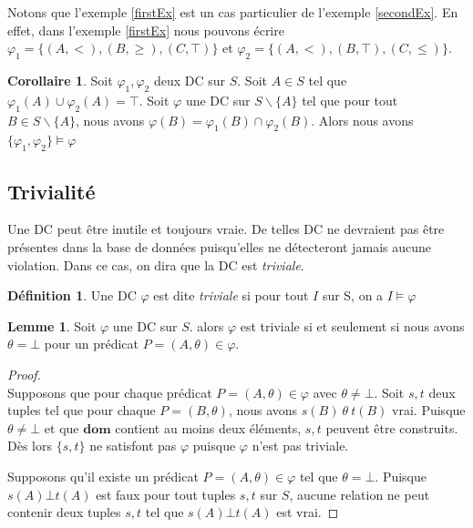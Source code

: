 \documentclass[letterpaper, 12pt]{report}
\theoremstyle{definition}
\newtheorem{mydef}{Définition}
\newtheorem{mylemma}{Lemme}
\newtheorem{mycorollaire}{Corollaire}
\newcommand{\dom}{\mathbf{dom}}
\newcommand{\alinea}{
\hspace*{0.5cm}}
\begin{document}
Notons que l'exemple \ref{firstEx} est un cas particulier de l'exemple \ref{secondEx}. En effet, dans l'exemple \ref{firstEx} nous pouvons écrire $\varphi_1 = \{(A,<),(B,\geq),(C,\top)  \}$ et $\varphi_2 = \{(A,<),(B,\top),(C,\leq)  \}$.\\

\begin{mycorollaire}
Soit $\varphi_1,\varphi_2$ deux DC sur $S$. Soit $A \in S$ tel que $\varphi_1(A)\cup\varphi_2(A) = \top$. Soit $\varphi$ une DC sur $S \backslash \{ A\}$ tel que pour tout $B \in S \backslash \{ A\}$, nous avons $\varphi(B) = \varphi_1(B) \cap \varphi_2(B)$. Alors nous avons $\{\varphi_1,\varphi_2 \} \models \varphi$
\end{mycorollaire}

\subsection{Trivialité}

Une DC peut être inutile et toujours vraie. De telles DC ne devraient pas être présentes dans la base de données puisqu'elles ne détecteront jamais aucune violation. Dans ce cas, on dira que la DC est \emph{triviale}. 
\begin{mydef}
	Une DC $\varphi$ est dite \emph{triviale} si pour tout $I$ sur S, on a $I \models \varphi$
\end{mydef}

\begin{mylemma} \label{trivialLemma}
Soit $\varphi$ une DC sur $S$. alors $\varphi$ est triviale si et seulement si nous avons $\theta = \bot$ pour un prédicat $P=(A,\theta) \in \varphi$.
\end{mylemma}
\begin{proof}
~\\
\alinea \framebox{$\implies$}
Supposons que pour chaque prédicat $P=(A,\theta) \in \varphi$ avec $\theta \neq \bot$. Soit $s,t$ deux tuples tel que pour chaque $P=(B,\theta)$, nous avons $s(B)\ \theta\ t(B)$ vrai.
Puisque $\theta \neq \bot$ et que $\dom$ contient au moins deux éléments, $s,t$ peuvent être construits. Dès lors $\{s,t\}$ ne satisfont pas $\varphi$ puisque $\varphi$ n'est pas triviale.

\framebox{$\impliedby$}
Supposons qu'il existe un prédicat $P=(A,\theta) \in \varphi$ tel que $\theta = \bot$.
Puisque $s(A) \bot t(A)$ est faux pour tout tuples $s,t$ sur $S$, aucune relation ne peut contenir deux tuples $s,t$ tel que $s(A) \bot t(A)$ est vrai.
\end{proof}
\end{document}
